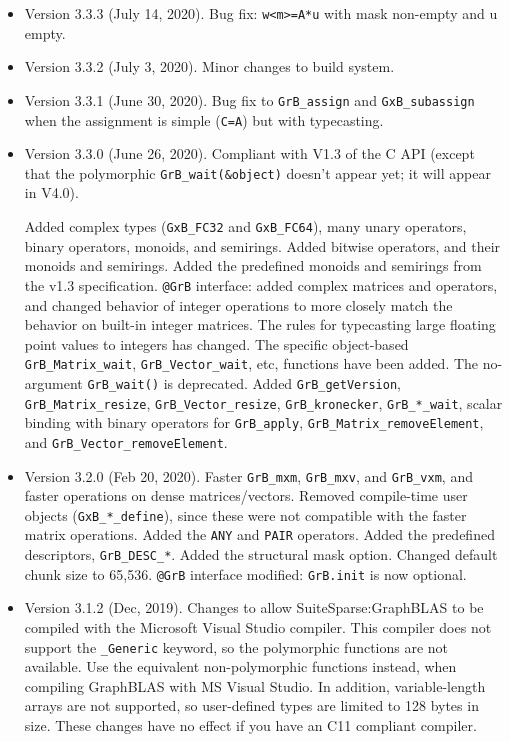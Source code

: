 \documentclass[12pt]{article}
\begin{document}
\begin{itemize}
\item Version 3.3.3 (July 14, 2020).
    Bug fix: \verb'w<m>=A*u' with mask non-empty and u empty.

\item Version 3.3.2 (July 3, 2020).  Minor changes to build system.

\item Version 3.3.1 (June 30, 2020).  Bug fix to \verb'GrB_assign' and
    \verb'GxB_subassign' when the assignment is simple (\verb'C=A') but
    with typecasting.

\item Version 3.3.0 (June 26, 2020).  Compliant with V1.3 of the C API
    (except that the polymorphic \verb'GrB_wait(&object)' doesn't appear yet;
    it will appear in V4.0).

    Added complex types (\verb'GxB_FC32' and \verb'GxB_FC64'), many unary
    operators, binary operators, monoids, and semirings.  Added bitwise
    operators, and their monoids and semirings.  Added the predefined monoids
    and semirings from the v1.3 specification.  \verb'@GrB' interface: added complex
    matrices and operators, and changed behavior of integer operations to more
    closely match the behavior on built-in integer matrices.  The rules for
    typecasting large floating point values to integers has changed.  The
    specific object-based \verb'GrB_Matrix_wait', \verb'GrB_Vector_wait', etc,
    functions have been added.  The no-argument \verb'GrB_wait()' is
    deprecated.  Added \verb'GrB_getVersion', \verb'GrB_Matrix_resize',
    \verb'GrB_Vector_resize', \verb'GrB_kronecker', \verb'GrB_*_wait', scalar
    binding with binary operators for \verb'GrB_apply', \newline
    \verb'GrB_Matrix_removeElement', and \verb'GrB_Vector_removeElement'.

\item Version 3.2.0 (Feb 20, 2020).  Faster \verb'GrB_mxm', \verb'GrB_mxv', and
    \verb'GrB_vxm', and faster operations on dense matrices/vectors.  Removed
    compile-time user objects (\verb'GxB_*_define'), since these were not
    compatible with the faster matrix operations.  Added the \verb'ANY' and
    \verb'PAIR' operators.  Added the predefined descriptors,
    \verb'GrB_DESC_*'.  Added the structural mask option.  Changed default
    chunk size to 65,536.  \verb'@GrB' interface modified:  \verb'GrB.init' is
    now optional.

\item Version 3.1.2 (Dec, 2019).  Changes to allow SuiteSparse:GraphBLAS
    to be compiled with the Microsoft Visual Studio compiler.  This compiler
    does not support the \verb'_Generic' keyword, so the polymorphic functions
    are not available.  Use the equivalent non-polymorphic functions instead,
    when compiling GraphBLAS with MS Visual Studio.  In addition,
    variable-length arrays are not supported, so user-defined types are limited
    to 128 bytes in size.  These changes have no effect if you have an C11
    compliant compiler.


\end{itemize}
\end{document}

